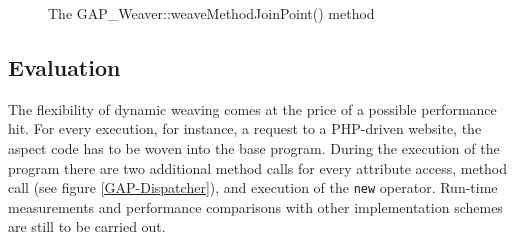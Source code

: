 \documentclass{acm_proc_article-sp}
\begin{document}
\begin{figure}[thb]%
\caption{The GAP\_Weaver::weaveMethodJoinPoint() method}
\label{weaveMethodJoinPoint}
\end{figure}

%
%

\subsection{Evaluation}
The flexibility of dynamic weaving comes at the price of a
possible performance hit. For every execution, for instance, a
request to a PHP-driven website, the aspect code has to be woven
into the base program. During the execution of the program there
are two additional method calls for every attribute access, method
call (see figure \ref{GAP-Dispatcher}), and execution of the
\texttt{new} operator. Run-time measurements and performance
comparisons with other implementation schemes are still to be
carried out.
\end{document}

